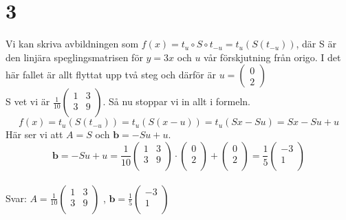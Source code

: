 \documentclass{article}
\begin{document}
\section*{3}
Vi kan skriva avbildningen som $f(x) = t_u \circ S \circ t_{-u} = t_u (S ( t_{-u} ) )$, där S är den linjära speglingsmatrisen för $y = 3x$ och $u$ vår förskjutning från origo. I det här fallet är allt flyttat
upp två steg och därför är 
$
u =
\begin{pmatrix}
	0 \\
	2 
\end{pmatrix}
$   \\
S vet vi är 
$
\frac{1}{10}
\begin{pmatrix}
	1	&	3 \\
	3	&	9 \\
\end{pmatrix}
$. 
Så nu stoppar vi in allt i formeln.
$$
f(x) =  t_u (S ( t_{-u} ) ) =  t_u (S ( x - u ) ) = t_u ( Sx - Su  ) = Sx - Su + u
$$
Här ser vi att $A = S$ och $\mathbf{b}  = -Su + u$. 
$$
\mathbf{b}  = 
-Su + u = 
\frac{1}{10}
\begin{pmatrix}
	1	&	3 \\
	3	&	9 \\
\end{pmatrix}
\cdot
\begin{pmatrix}
	0 \\
	2 \\
\end{pmatrix}
+
\begin{pmatrix}
	0 \\
	2 \\
\end{pmatrix}
=
\frac{1}{5}
\begin{pmatrix}
	-3 \\
	1 \\
\end{pmatrix}
$$
\\
Svar: 
$A = 
\frac{1}{10}
\begin{pmatrix}
	1	&	3 \\
	3	&	9 \\
\end{pmatrix}
$
, 
\qquad
$\mathbf{b} = 
\frac{1}{5}
\begin{pmatrix}
	-3 \\
	1 \\
\end{pmatrix}
$
\end{document}
